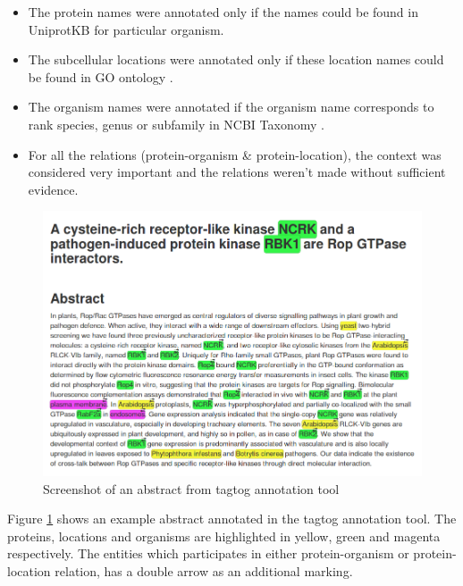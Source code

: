 \begin{itemize}

\item The protein names were annotated only if the names could be found in UniprotKB \cite{magrane2011uniprot} for particular organism.

\item The subcellular locations were annotated only if these location names could be found in GO ontology \cite{ashburner2000gene}.

\item The organism names were annotated if the organism name corresponds to rank species, genus or subfamily in NCBI Taxonomy \cite{ncbiTaxonomy}.

\item For all the relations (protein-organism \& protein-location), the context was considered very important and the relations weren't made without sufficient evidence.

\end{itemize}


\begin{figure}
\includegraphics[scale=0.4]{figures/tagtog_screenshot.png}
\caption{Screenshot of an abstract from tagtog annotation tool}\label{fig:tagtogScreenshot}
\end{figure}

Figure \ref{fig:tagtogScreenshot} shows an example abstract annotated in the tagtog annotation tool. The proteins, locations and organisms are highlighted in yellow, green and magenta respectively. The entities which participates in either protein-organism or protein-location relation, has a double arrow as an additional marking.

